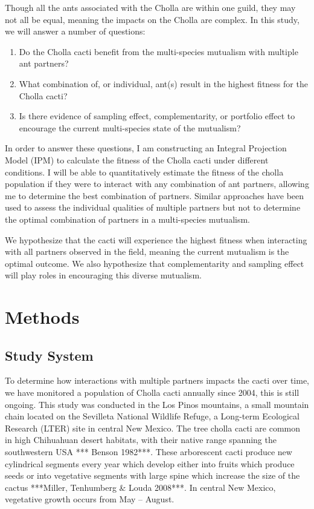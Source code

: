 \documentclass[12pt,a4paper]{article}
\begin{document}
    Though all the ants associated with the Cholla are within one guild, they may not all be equal, meaning the impacts on the Cholla are complex. In this study, we will answer a number of questions: 
    \begin{enumerate}
        \item Do the Cholla cacti benefit from the multi-species mutualism with multiple ant partners?
        \item What combination of, or individual, ant(s) result in the highest fitness for the Cholla cacti?
        \item Is there evidence of sampling effect, complementarity, or portfolio effect to encourage the current multi-species state of the mutualism?
    \end{enumerate}
    
    In order to answer these questions, I am constructing an Integral Projection Model (IPM) to calculate the fitness of the Cholla cacti under different conditions. I will be able to quantitatively estimate the fitness of the cholla population if they were to interact with any combination of ant partners, allowing me to determine the best combination of partners. Similar approaches have been used to assess the individual qualities of multiple partners\cite{Palmer2010} but not to determine the optimal combination of partners in a multi-species mutualism. 
    
    We hypothesize that the cacti will experience the highest fitness when interacting with all partners observed in the field, meaning the current mutualism is the optimal outcome. We also hypothesize that complementarity and sampling effect will play roles in encouraging this diverse mutualism. 	
	
	\section*{Methods}
		\subsection*{Study System}
    To determine how interactions with multiple partners impacts the cacti over time, we have monitored a population of Cholla cacti annually since 2004, this is still ongoing. This study was conducted in the Los Pinos mountains, a small mountain chain located on the Sevilleta National Wildlife Refuge, a Long-term Ecological Research (LTER) site in central New Mexico. The tree cholla cacti are common in high Chihuahuan desert habitats, with their native range spanning the southwestern USA *** Benson 1982***. These arborescent cacti produce new cylindrical segments every year which develop either into fruits which produce seeds or into vegetative segments with large spine which increase the size of the cactus ***Miller, Tenhumberg & Louda 2008***. In central New Mexico, vegetative growth occurs from May -- August.
	
\end{document}
